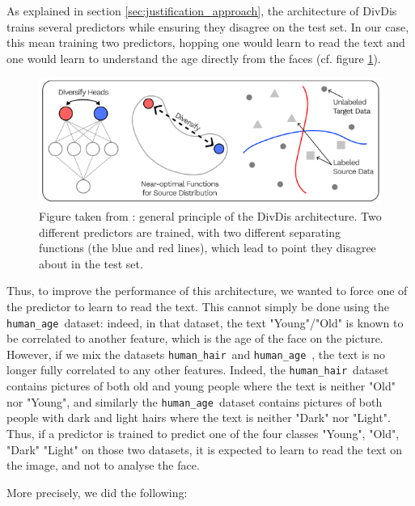 \documentclass[sigconf, nonacm]{acmart}
\newcommand{\humanAge}{\texttt{human\_age}\ }
\newcommand{\humanHair}{\texttt{human\_hair}\ }
\begin{document}
As explained in section \ref{sec:justification_approach}, the architecture of DivDis trains several predictors while ensuring they disagree on the test set. In our case, this mean training two predictors, hopping one would learn to read the text and one would learn to understand the age directly from the faces (cf. figure \ref{fig:divdis}). 

\begin{figure}[!h]
    \centering
    \includegraphics[width=\columnwidth]{figures/divdis.png}
    \caption{Figure taken from \cite{lee_diversify_2022}: general principle of the DivDis architecture. Two different predictors are trained, with two different separating functions (the blue and red lines), which lead to point they disagree about in the test set.}
    \label{fig:divdis}
\end{figure}

Thus, to improve the performance of this architecture, we wanted to force one of the predictor to learn to read the text. This cannot simply be done using the \humanAge dataset: indeed, in that dataset, the text "Young"/"Old" is known to be correlated to another feature, which is the age of the face on the picture. However, if we mix the datasets \humanHair and \humanAge, the text is no longer fully correlated to any other features. Indeed, the \humanHair dataset contains pictures of both old and young people where the text is neither "Old" nor "Young", and similarly the \humanAge dataset contains pictures of both people with dark and light hairs where the text is neither "Dark" nor "Light". Thus, if a predictor is trained to predict one of the four classes "Young", "Old", "Dark" "Light" on those two datasets, it is expected to learn to read the text on the image, and not to analyse the face.

More precisely, we did the following:
\end{document}
